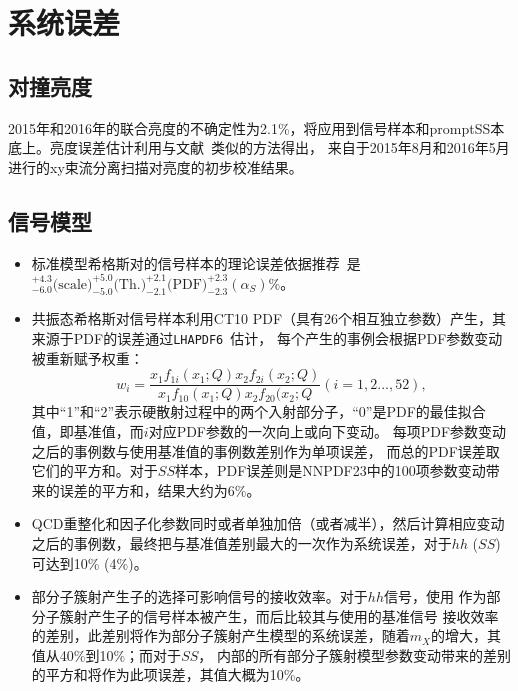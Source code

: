 \section{系统误差}\label{sec:4w_systematics}

\subsection{对撞亮度}
2015年和2016年的联合亮度的不确定性为2.1\%，将应用到信号样本和promptSS本底上。亮度误差估计利用与文献~\cite{DAPR-2013-01}类似的方法得出，
来自于2015年8月和2016年5月进行的xy束流分离扫描对亮度的初步校准结果。

\subsection{信号模型}
\begin{itemize}
 \item 标准模型希格斯对的信号样本的理论误差依据推荐~\cite{LHCdiHiggsXsec}是\\ 
 $^{+4.3}_{-6.0}\text{(scale)} ^{+5.0}_{-5.0}\text{(Th.)}  ^{+2.1}_{-2.1}\text{(PDF)} ^{+2.3}_{-2.3} (\alpha_S)$\%。
  \item 共振态希格斯对信号样本利用CT10 PDF（具有26个相互独立参数）产生，其来源于PDF的误差通过\texttt{LHAPDF6}~\cite{Buckley:2014ana}估计，
  每个产生的事例会根据PDF参数变动被重新赋予权重：\\
  \begin{equation}
w_{i}=\frac{x_1f_{1i}(x_1;Q) x_2f_{2i}(x_2;Q)}{x_1f_{10}(x_1;Q) x_2f_{20}(x_2;Q} (i=1,2...,52),
  \end{equation}
  其中``1''和``2''表示硬散射过程中的两个入射部分子，``0''是PDF的最佳拟合值，即基准值，而$i$对应PDF参数的一次向上或向下变动。
  每项PDF参数变动之后的事例数与使用基准值的事例数差别作为单项误差，
  而总的PDF误差取它们的平方和。对于$SS$样本，PDF误差则是NNPDF23中的100项参数变动带来的误差的平方和，结果大约为6\%。
   \item QCD重整化和因子化参数同时或者单独加倍（或者减半），然后计算相应变动之后的事例数，最终把与基准值差别最大的一次作为系统误差，对于$hh$  ($SS$)可达到10\% (4\%)。
   \item 部分子簇射产生子的选择可影响信号的接收效率。对于$hh$信号，使用 作为部分子簇射产生子的信号样本被产生，而后比较其与使用\Herwigpp 的基准信号
   接收效率的差别，此差别将作为部分子簇射产生模型的系统误差，随着$m_X$的增大，其值从40\%到10\%；而对于$SS$， 内部的所有部分子簇射模型参数变动带来的差别
   的平方和将作为此项误差，其值大概为10\%。
\end{itemize}

